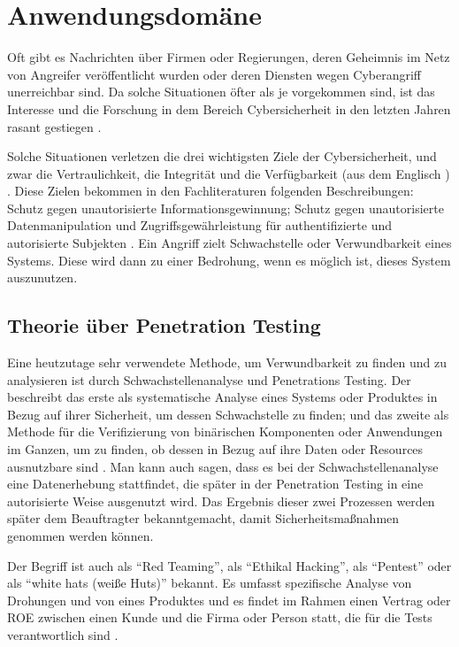 \section{Anwendungsdomäne}

Oft gibt es Nachrichten über Firmen oder Regierungen, deren Geheimnis im Netz von Angreifer veröffentlicht wurden oder deren Diensten wegen \gls{Cyberangriff} unerreichbar sind. Da solche Situationen öfter als je vorgekommen sind, ist das Interesse und die Forschung in dem Bereich \gls{Cybersicherheit} in den letzten Jahren rasant gestiegen \cite{Tanembaum_MBS}. 

Solche Situationen verletzen die drei wichtigsten Ziele der \gls{Cybersicherheit}, und zwar die Vertraulichkeit, die Integrität und die Verfügbarkeit (aus dem Englisch ) . Diese Zielen bekommen in den Fachliteraturen folgenden Beschreibungen: Schutz gegen unautorisierte Informationsgewinnung; Schutz gegen unautorisierte Datenmanipulation und Zugriffsgewährleistung für authentifizierte und autorisierte Subjekten \cite{Wendzel_It-Sicherheit}. Ein Angriff zielt \gls{Schwachstelle} oder \gls{Verwundbarkeit} eines Systems. Diese wird dann zu einer Bedrohung, wenn es möglich ist, dieses System auszunutzen.

\subsection{Theorie über Penetration Testing}

Eine heutzutage sehr verwendete Methode, um \gls{Verwundbarkeit} zu finden und zu analysieren ist durch Schwachstellenanalyse und Penetrations Testing. Der  beschreibt das erste als systematische Analyse eines Systems oder Produktes in Bezug auf ihrer Sicherheit, um dessen \gls{Schwachstelle} zu finden; und das zweite als Methode für die Verifizierung von binärischen Komponenten oder Anwendungen im Ganzen, um zu finden, ob dessen  in Bezug auf ihre Daten oder Resources ausnutzbare sind \cite{NIST_Definitionen}. Man kann auch sagen, dass es bei der Schwachstellenanalyse eine Datenerhebung stattfindet, die später in der Penetration Testing in eine autorisierte Weise ausgenutzt wird\cite{Goel_VulAsses_PenTest}. Das Ergebnis dieser zwei Prozessen werden später dem Beauftragter bekanntgemacht, damit Sicherheitsmaßnahmen genommen werden können.

Der Begriff ist auch als ``Red Teaming'', als ``Ethikal Hacking'', als ``Pentest'' oder als ``white hats (weiße Huts)'' bekannt. Es umfasst spezifische Analyse von Drohungen und von  eines Produktes und es findet im Rahmen einen Vertrag oder \gls{ROE} zwischen einen Kunde und die Firma oder Person statt, die für die Tests verantwortlich sind \cite{Bishop_PenTest}.

